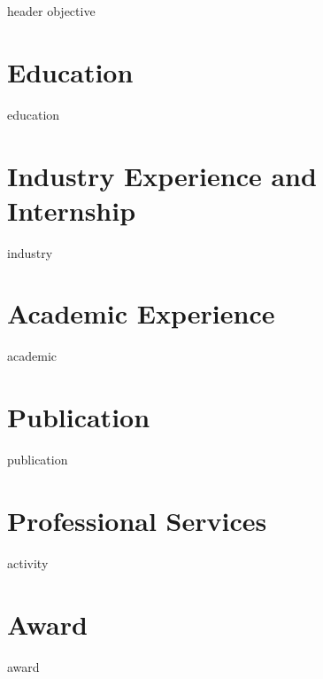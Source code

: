 \documentclass[letter,10pt]{article}
\begin{document}
{header}
{objective}

\section{Education}
{education}

\section{Industry Experience and Internship}
{industry}

\section{Academic Experience}
{academic}

\section{Publication}
{publication}



\section{Professional Services}
{activity}

\section{Award}
{award}
\end{document}
